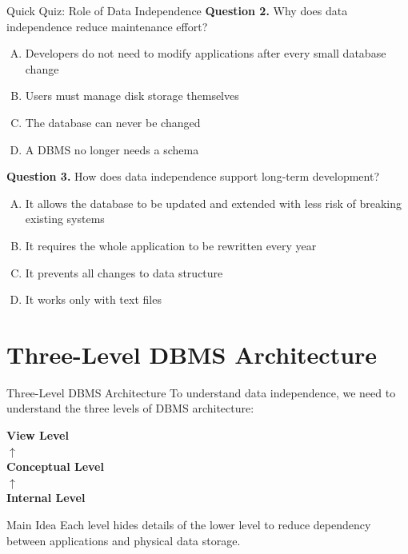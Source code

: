 \documentclass[aspectratio=169,11pt]{beamer}
\begin{document}
\begin{frame}{Quick Quiz: Role of Data Independence}
\textbf{Question 2.} Why does data independence reduce maintenance effort?
\begin{enumerate}[A.]
  \item Developers do not need to modify applications after every small database change
  \item Users must manage disk storage themselves
  \item The database can never be changed
  \item A DBMS no longer needs a schema
\end{enumerate}

\vspace{0.2cm}
\textbf{Question 3.} How does data independence support long-term development?
\begin{enumerate}[A.]
  \item It allows the database to be updated and extended with less risk of breaking existing systems
  \item It requires the whole application to be rewritten every year
  \item It prevents all changes to data structure
  \item It works only with text files
\end{enumerate}
\end{frame}

\section{Three-Level DBMS Architecture}

\begin{frame}{Three-Level DBMS Architecture}
To understand data independence, we need to understand the three levels of DBMS architecture:

\vspace{0.4cm}
\begin{center}
\Large
\textbf{View Level}\\[0.2cm]
$\uparrow$\\[0.2cm]
\textbf{Conceptual Level}\\[0.2cm]
$\uparrow$\\[0.2cm]
\textbf{Internal Level}
\end{center}

\vspace{0.2cm}
\begin{alertblock}{Main Idea}
Each level hides details of the lower level to reduce dependency between applications and physical data storage.
\end{alertblock}
\end{frame}
\end{document}

